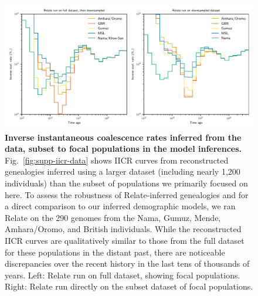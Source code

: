 \documentclass[]{article}
\begin{document}
\begin{figure}[ht]
    \centering
    \includegraphics[width=\textwidth]{figures/supp-relate-iicr-data-full-and-subset}
    \caption{
        \textbf{Inverse instantaneous coalescence rates inferred from the data,
        subset to focal populations in the model inferences.}
        Fig.~\ref{fig:supp-iicr-data} shows IICR curves from reconstructed
        genealogies inferred using a larger dataset (including nearly 1,200
        individuals) than the subset of populations we primarily focused on
        here. To assess the robustness of Relate-inferred genealogies and for a
        direct comparison to our inferred demographic models, we ran Relate on
        the 290 genomes from the Nama, Gumuz, Mende, Amhara/Oromo, and British individuals.
        While the reconstructed IICR curves are qualitatively similar to those
        from the full dataset for these populations in the distant past, there
        are noticeable discrepancies over the recent history in the last tens of
        thousands of years. Left: Relate run on full dataset, showing focal
        populations. Right: Relate run directly on the subset dataset of focal
        populations.
    }
    \label{fig:supp-iicr-data-subset}
\end{figure}
\end{document}
